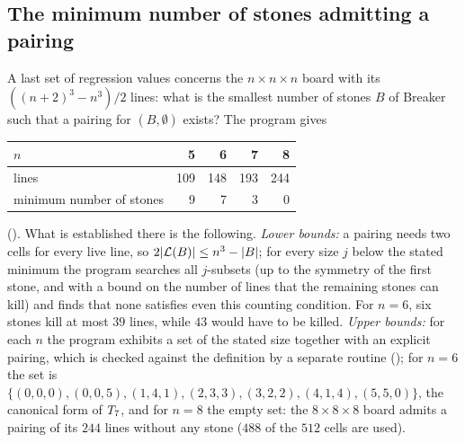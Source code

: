\subsection{The minimum number of stones admitting a pairing}\label{ssec:fmt-minstones}

A last set of regression values concerns the $n\times n\times n$ board with its $((n+2)^3-n^3)/2$ lines:
what is the smallest number of stones $B$ of Breaker such that a pairing for $(B,\emptyset)$ exists? The
program  gives
\begin{center}\small
\begin{tabular}{@{}lrrrr@{}}
\toprule
$n$ & 5 & 6 & 7 & 8\\
\midrule
lines & 109 & 148 & 193 & 244\\
minimum number of stones & 9 & 7 & 3 & 0\\
\bottomrule
\end{tabular}
\end{center}
(). What is established there is the following. \emph{Lower
bounds:} a pairing needs two cells for every live line, so $2|\mathcal{L}(B)|\le n^3-|B|$; for every size $j$
below the stated minimum the program searches all $j$-subsets (up to the symmetry of the first stone,
and with a bound on the number of lines that the remaining stones can kill) and finds that none satisfies
even this counting condition. For $n=6$, six stones kill at most $39$ lines, while $43$ would have to be
killed. \emph{Upper bounds:} for each $n$ the program exhibits a set of the stated size together with an
explicit pairing, which is checked against the definition by a separate routine
(); for $n=6$ the set is
$\{(0,0,0),(0,0,5),(1,4,1),(2,3,3),(3,2,2),(4,1,4),(5,5,0)\}$, the canonical form of $T_7$, and for $n=8$
the empty set: the $8\times8\times8$ board admits a pairing of its $244$ lines without any stone ($488$ of
the $512$ cells are used).
